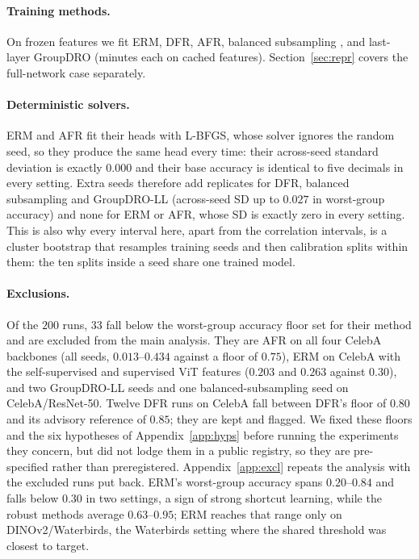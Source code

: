 \documentclass[pdflatex,sn-basic]{sn-jnl}%
\theoremstyle{thmstyleone}%
\begin{document}
\paragraph{Training methods.} On frozen features we fit
ERM, DFR, AFR, balanced subsampling \citep{idrissi2022balancing}, and last-layer
GroupDRO (minutes each on cached
features). Section~\ref{sec:repr} covers the full-network case separately.

\paragraph{Deterministic solvers.} ERM and AFR fit their heads with L-BFGS,
whose solver ignores the random seed, so they produce the same head every time: their
across-seed standard deviation is exactly $0.000$ and their base accuracy is identical
to five decimals in every setting. Extra seeds therefore add replicates for DFR,
balanced subsampling and GroupDRO-LL (across-seed SD up to $0.027$ in worst-group
accuracy) and none for ERM or AFR, whose SD is exactly zero in every setting. This is also why every interval here, apart from the
correlation intervals, is a cluster bootstrap that resamples training seeds and then calibration
splits within them: the ten splits inside a seed share one trained model.

\paragraph{Exclusions.} Of the $200$ runs, $33$ fall below the worst-group accuracy floor
set for their method and are excluded from the main analysis. They are AFR on all four CelebA
backbones (all seeds, $0.013$--$0.434$ against a floor of $0.75$), ERM on CelebA with the
self-supervised and supervised ViT features ($0.203$ and $0.263$ against $0.30$), and two
GroupDRO-LL seeds and one balanced-subsampling seed on CelebA/ResNet-50. Twelve DFR runs on
CelebA fall between DFR's floor of $0.80$ and its advisory reference of $0.85$; they are kept and flagged. We
fixed these floors and the six hypotheses of Appendix~\ref{app:hyps} before running the experiments
they concern, but did not lodge them in a public registry, so they are pre-specified rather than
preregistered. Appendix~\ref{app:excl} repeats the analysis with the excluded runs put back.
ERM's worst-group accuracy spans $0.20$--$0.84$ and falls below $0.30$ in two settings, a sign of
strong shortcut learning, while the robust methods average $0.63$--$0.95$; ERM reaches that range
only on DINOv2/Waterbirds, the Waterbirds setting where the shared threshold was closest to target.
\end{document}
